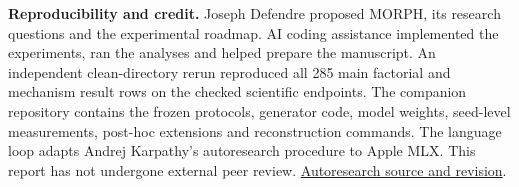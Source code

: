 \documentclass[11pt,letterpaper]{article}
\newcommand{\topic}[1]{\par\medskip\noindent\textbf{#1}\enspace}
\newcommand{\source}[2]{\href{#1}{#2}}
\begin{document}
\topic{Reproducibility and credit.} Joseph Defendre proposed MORPH, its research questions and the experimental roadmap. AI coding assistance implemented the experiments, ran the analyses and helped prepare the manuscript. An independent clean-directory rerun reproduced all 285 main factorial and mechanism result rows on the checked scientific endpoints. The companion repository contains the frozen protocols, generator code, model weights, seed-level measurements, post-hoc extensions and reconstruction commands. The language loop adapts Andrej Karpathy's autoresearch procedure to Apple MLX. This report has not undergone external peer review. \source{https://github.com/karpathy/autoresearch/tree/228791fb499afffb54b46200aca536f79142f117}{Autoresearch source and revision}.
\newpage

\end{document}
